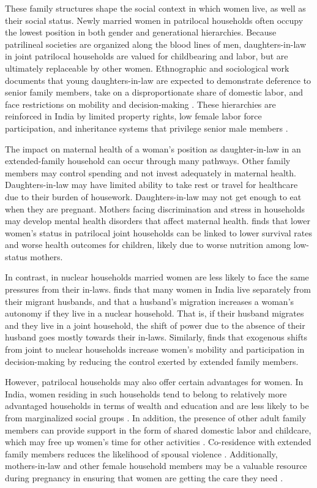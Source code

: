 \documentclass[12pt]{article}
\begin{document}
These family structures shape the social context in which women live, as well as their social status. Newly married women in patrilocal households often occupy the lowest position in both gender and generational hierarchies. Because patrilineal societies are organized along the blood lines of men, daughters-in-law in joint patrilocal households are valued for childbearing and labor, but are ultimately replaceable by other women. Ethnographic and sociological work documents that young daughters-in-law are expected to demonstrate deference to senior family members, take on a disproportionate share of domestic labor, and face restrictions on mobility and decision-making \citep{mandelbaum1988women, jeffery1989labour}. These hierarchies are reinforced in India by limited property rights, low female labor force participation, and inheritance systems that privilege senior male members \cite{jayachandran2015roots}. 

The impact on maternal health of a woman's position as daughter-in-law in an extended-family household can occur through many pathways. Other family members may control spending and not invest adequately in maternal health. Daughters-in-law may have limited ability to take rest or travel for healthcare due to their burden of housework. Daughters-in-law may not get enough to eat when they are pregnant. Mothers facing discrimination and stress in households may develop mental health disorders that affect maternal health. \cite{coffey2022mothers} finds that lower women’s status in patrilocal joint households can be linked to lower survival rates and worse health outcomes for children, likely due to worse nutrition among low-status mothers.

In contrast, in nuclear households married women are less likely to face the same pressures from their in-laws. \cite{desai2008negotiated} finds that many women in India live separately from their migrant husbands, and that a husband's migration increases a woman's autonomy if they live in a nuclear household. That is, if their husband migrates and they live in a joint household, the shift of power due to the absence of their husband goes mostly towards their in-laws. Similarly, \cite{mookerjee2019gender} finds that exogenous shifts from joint to nuclear households increase women’s mobility and participation in decision-making by reducing the control exerted by extended family members.

However, patrilocal households may also offer certain advantages for women. In India, women residing in such households tend to belong to relatively more advantaged households in terms of wealth and education and are less likely to be from marginalized social groups \cite{allendorf2012women, breton2021modernisation}. In addition, the presence of other adult family members can provide support in the form of shared domestic labor and childcare, which may free up women’s time for other activities \cite{khanna2024role}. Co-residence with extended family members reduces the likelihood of spousal violence \cite{khanna2024role}. Additionally, mothers-in-law and other female household members may be a valuable resource during pregnancy in ensuring that women are getting the care they need \cite{varghese2019coresidence}.
\end{document}
